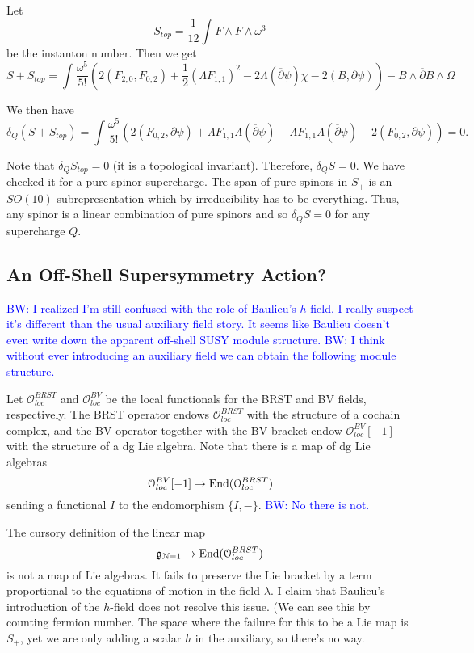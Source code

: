\documentclass[10pt, oneside]{article}
\newcommand{\brian}[1]{\textcolor{blue}{BW: #1}}
\begin{document}
Let
\[S_{top} = \frac{1}{12}\int F\wedge F\wedge \omega^3\]
be the instanton number. Then we get
\[
S + S_{top} = \int \frac{\omega^5}{5!}\left(2(F_{2, 0}, F_{0, 2}) + \frac{1}{2} (\Lambda F_{1, 1})^2 - 2\Lambda(\overline{\partial}\psi) \chi - 2(B, \partial \psi)\right) - B\wedge \overline{\partial} B\wedge \Omega
\]

We then have
\[\delta_Q(S+S_{top}) = \int \frac{\omega^5}{5!}\left(2(F_{0, 2}, \partial \psi) + \Lambda F_{1, 1} \Lambda(\overline{\partial}\psi) - \Lambda F_{1, 1} \Lambda(\overline{\partial}\psi) - 2(F_{0, 2}, \partial \psi)\right) = 0.
\]

Note that $\delta_Q S_{top} = 0$ (it is a topological invariant). Therefore, $\delta_Q S = 0$. We have checked it for a pure spinor supercharge. The span of pure spinors in $S_+$ is an $SO(10)$-subrepresentation which by irreducibility has to be everything. Thus, any spinor is a linear combination of pure spinors and so $\delta_Q S = 0$ for any supercharge $Q$.

\subsection{An Off-Shell Supersymmetry Action?}
\brian{I realized I'm still confused with the role of Baulieu's $h$-field. 
I really suspect it's different than the usual auxiliary field story. 
It seems like Baulieu doesn't even write down the apparent off-shell SUSY module structure. 
}
\brian{I think without ever introducing an auxiliary field we can obtain the following module structure.}

\def\oloc{\mathcal{O}_{loc}}

Let $\oloc^{BRST}$ and $\oloc^{BV}$ be the local functionals for the BRST and BV fields, respectively. 
The BRST operator endows $\oloc^{BRST}$ with the structure of a cochain complex, and the BV operator together with the BV bracket endow $\oloc^{BV}[-1]$ with the structure of a dg Lie algebra. 
Note that there is a map of dg Lie algebras
\[
\oloc^{BV}[-1] \to {\rm End}(\oloc^{BRST})
\]
sending a functional $I$ to the endomorphism $\{I,-\}$.
\brian{No there is not.}

\def\cN{\mathcal{N}}

The cursory definition of the linear map
\[
\mf g_{\cN=1} \to {\rm End}(\oloc^{BRST})
\]
is not a map of Lie algebras. 
It fails to preserve the Lie bracket by a term proportional to the equations of motion in the field $\lambda$. 
I claim that Baulieu's introduction of the $h$-field does not resolve this issue. (We can see this by counting fermion number. 
The space where the failure for this to be a Lie map is $S_+$, yet we are only adding a scalar $h$ in the auxiliary, so there's no way.
\end{document}
